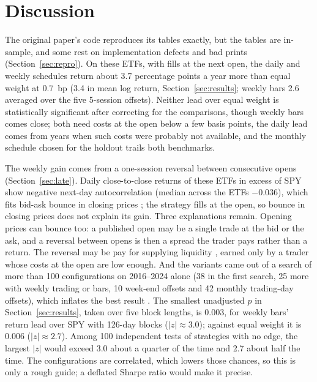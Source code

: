 \documentclass[11pt]{article}
\begin{document}
\section{Discussion}\label{sec:discussion}

The original paper's code reproduces its tables exactly, but the tables are in-sample, and some
rest on implementation defects and bad prints (Section~\ref{sec:repro}). On these ETFs, with
fills at the next open, the daily and weekly schedules return about 3.7 percentage points a
year more than equal weight at 0.7~bp (3.4 in mean log return, Section~\ref{sec:results};
weekly bars 2.6 averaged over the five 5-session offsets). Neither lead over equal weight is statistically significant
after correcting for the comparisons, though weekly bars comes close; both need costs at the
open below a few basis points, the daily lead comes
from years when such costs were probably not available, and the monthly schedule chosen for the holdout
trails both benchmarks.

The weekly gain comes from a one-session reversal between consecutive opens
(Section~\ref{sec:late}). Daily close-to-close returns of these ETFs in excess of SPY show
negative next-day autocorrelation (median across the ETFs $-0.036$), which fits bid-ask bounce in
closing prices \citep{roll1984}; the strategy fills at the open, so bounce in closing prices
does not explain its gain. Three explanations remain. Opening prices can bounce too: a published
open may be a single trade at the bid or the ask, and a reversal between opens is then a spread
the trader pays rather than a return. The reversal may be pay for supplying liquidity
\citep{nagel2012}, earned only by a trader whose costs at the open are low enough. And the
variants came out of a search of more than 100 configurations on 2016--2024 alone (38 in the
first search, 25 more with weekly trading or bars, 10 week-end offsets and 42 monthly trading-day
offsets), which inflates the best result \citep{harvey2016}. The smallest unadjusted $p$ in
Section~\ref{sec:results}, taken over five block lengths, is 0.003, for weekly bars' return lead over SPY with 126-day blocks
($|z| \approx 3.0$); against equal weight it is 0.006 ($|z| \approx 2.7$). Among 100 independent
tests of strategies with no edge, the largest $|z|$ would exceed 3.0 about a quarter of the time
and 2.7 about half the time. The configurations are correlated, which lowers those chances, so
this is only a rough guide; a deflated Sharpe ratio \citep{bailey2014} would make it precise.
\end{document}
